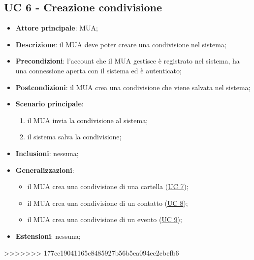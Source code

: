 \subsection{UC 6 - Creazione condivisione} \label{sec:UC6}
    \begin{itemize}
        \item \textbf{Attore principale}: MUA;
        \item \textbf{Descrizione}: il MUA deve poter creare una condivisione nel sistema;
        \item \textbf{Precondizioni}: l’account che il MUA gestisce è registrato nel sistema, ha una connessione aperta con il sistema ed è autenticato;
        \item \textbf{Postcondizioni}: il MUA crea una condivisione che viene salvata nel sistema;
        \item \textbf{Scenario principale}:
        \begin{enumerate}
            \item il MUA invia la condivisione al sistema;
            \item il sistema salva la condivisione;
        \end{enumerate}
    \item \textbf{Inclusioni}: nessuna;
    \item \textbf{Generalizzazioni}:
        \begin{itemize}
            \item il MUA crea una condivisione di una cartella (\hyperref[sec:UC7]{UC 7});
            \item il MUA crea una condivisione di un contatto (\hyperref[sec:UC8]{UC 8});
            \item il MUA crea una condivisione di un evento (\hyperref[sec:UC9]{UC 9});
        \end{itemize}
    \item \textbf{Estensioni}: nessuna;
\end{itemize}
>>>>>>> 177cc19041165c8485927b56b5ea094ec2cbcfb6
